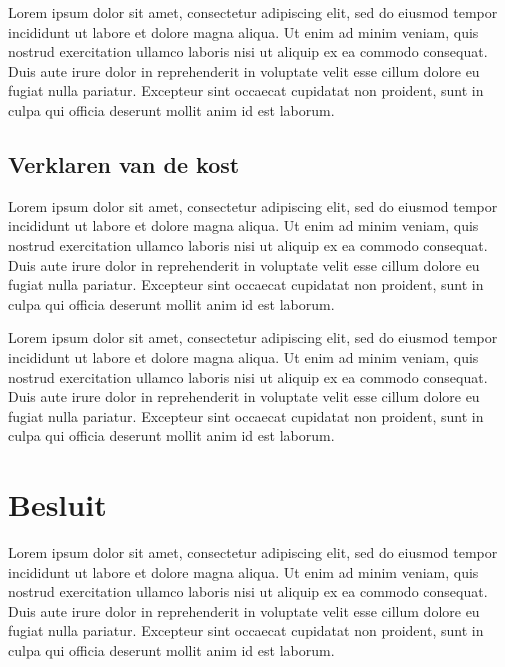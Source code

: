 \documentclass[a4paper]{kulakarticle}
\begin{document}
	Lorem ipsum dolor sit amet, consectetur adipiscing elit, sed do eiusmod tempor incididunt ut labore et dolore magna aliqua. Ut enim ad minim veniam, quis nostrud exercitation ullamco laboris nisi ut aliquip ex ea commodo consequat. Duis aute irure dolor in reprehenderit in voluptate velit esse cillum dolore eu fugiat nulla pariatur. Excepteur sint occaecat cupidatat non proident, sunt in culpa qui officia deserunt mollit anim id est laborum.
	
	\subsection{Verklaren van de kost}
	
	Lorem ipsum dolor sit amet, consectetur adipiscing elit, sed do eiusmod tempor incididunt ut labore et dolore magna aliqua. Ut enim ad minim veniam, quis nostrud exercitation ullamco laboris nisi ut aliquip ex ea commodo consequat. Duis aute irure dolor in reprehenderit in voluptate velit esse cillum dolore eu fugiat nulla pariatur. Excepteur sint occaecat cupidatat non proident, sunt in culpa qui officia deserunt mollit anim id est laborum.
	
	Lorem ipsum dolor sit amet, consectetur adipiscing elit, sed do eiusmod tempor incididunt ut labore et dolore magna aliqua. Ut enim ad minim veniam, quis nostrud exercitation ullamco laboris nisi ut aliquip ex ea commodo consequat. Duis aute irure dolor in reprehenderit in voluptate velit esse cillum dolore eu fugiat nulla pariatur. Excepteur sint occaecat cupidatat non proident, sunt in culpa qui officia deserunt mollit anim id est laborum.
	
	\section*{Besluit}
	Lorem ipsum dolor sit amet, consectetur adipiscing elit, sed do eiusmod tempor incididunt ut labore et dolore magna aliqua. Ut enim ad minim veniam, quis nostrud exercitation ullamco laboris nisi ut aliquip ex ea commodo consequat. Duis aute irure dolor in reprehenderit in voluptate velit esse cillum dolore eu fugiat nulla pariatur. Excepteur sint occaecat cupidatat non proident, sunt in culpa qui officia deserunt mollit anim id est laborum.
	
\end{document}
